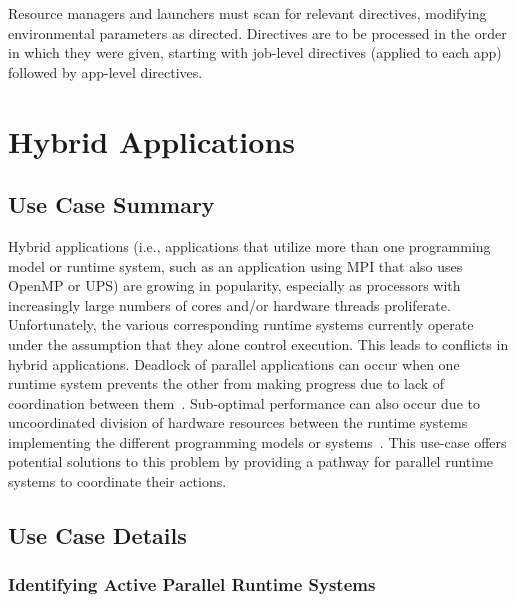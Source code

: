


Resource managers and launchers must scan for relevant directives, modifying environmental parameters as directed. Directives are to be processed in the order in which they were given, starting with job-level directives (applied to each app) followed by app-level directives.

\section{Hybrid Applications}
\label{app:uc-hybrid-applications}

\subsection{Use Case Summary}

Hybrid applications (i.e., applications that utilize more than one programming model or runtime system, such as an application using MPI that also uses OpenMP or UPS) are growing in popularity, especially as processors with increasingly large numbers of cores and/or hardware threads proliferate. Unfortunately, the various corresponding runtime systems currently operate under the assumption that they alone control execution. This leads to conflicts in hybrid applications. Deadlock of parallel applications can occur when one runtime system prevents the other from making progress due to lack of coordination between them~\cite{2016:Hamidouche}. Sub-optimal performance can also occur due to uncoordinated division of hardware resources between the runtime systems implementing the different programming models or systems~\cite{ompix-moc,2018:Vallee}. This use-case offers potential solutions to this
problem by providing a pathway for parallel runtime systems to coordinate their actions.

\subsection{Use Case Details}

\subsubsection{Identifying Active Parallel Runtime Systems}

